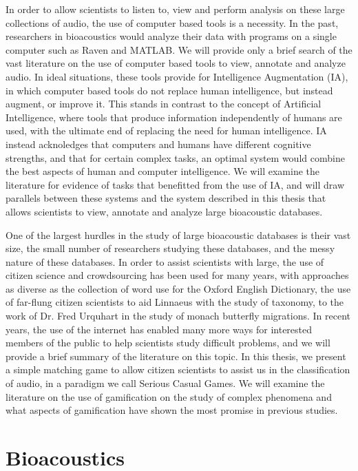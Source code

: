 \documentclass[12pt,oneside]{book}
\begin{document}
In order to allow scientists to listen to, view and perform analysis
on these large collections of audio, the use of computer based tools
is a necessity.  In the past, researchers in bioacoustics would
analyze their data with programs on a single computer such as Raven
and MATLAB.  We will provide only a brief search of the vast
literature on the use of computer based tools to view, annotate and
analyze audio.  In ideal situations, these tools provide for
Intelligence Augmentation (IA), in which computer based tools do not
replace human intelligence, but instead augment, or improve it.  This
stands in contrast to the concept of Artificial Intelligence, where
tools that produce information independently of humans are used, with
the ultimate end of replacing the need for human intelligence.  IA
instead acknoledges that computers and humans have different cognitive
strengths, and that for certain complex tasks, an optimal system would
combine the best aspects of human and computer intelligence.  We will
examine the literature for evidence of tasks that benefitted from the
use of IA, and will draw parallels between these systems and the
system described in this thesis that allows scientists to view,
annotate and analyze large bioacoustic databases.

One of the largest hurdles in the study of large bioacoustic databases
is their vast size, the small number of researchers studying these
databases, and the messy nature of these databases.  In order to
assist scientists with large, the use of citizen science and
crowdsourcing has been used for many years, with approaches as diverse
as the collection of word use for the Oxford English Dictionary, the
use of far-flung citizen scientists to aid Linnaeus with the study of
taxonomy, to the work of Dr. Fred Urquhart in the study of monach
butterfly migrations.  In recent years, the use of the internet has
enabled many more ways for interested members of the public to help
scientists study difficult problems, and we will provide a brief
summary of the literature on this topic.  In this thesis, we present a
simple matching game to allow citizen scientists to assist us in the
classification of audio, in a paradigm we call Serious Casual Games.
We will examine the literature on the use of gamification on the study
of complex phenomena and what aspects of gamification have shown the
most promise in previous studies.

\section{Bioacoustics}
\label{section:relatedWork:bioacoustics}
\end{document}
